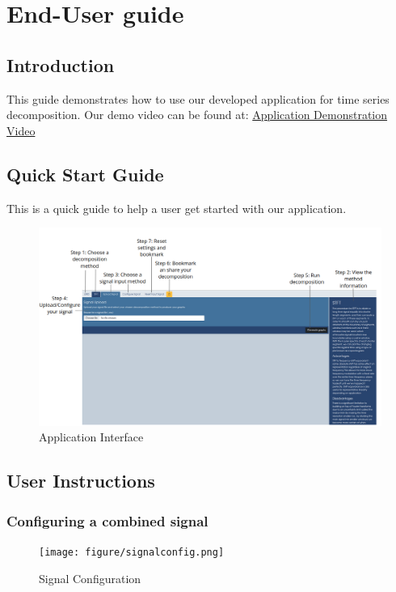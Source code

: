 \section{End-User guide}
\subsection{Introduction}
This guide demonstrates how to use our developed application for time series decomposition.
Our demo video can be found at: 
\href{https://www.overleaf.com/learn}{Application Demonstration Video}

\subsection{Quick Start Guide}
This is a quick guide to help a user get started with our application.
\begin{figure}
\centering
\includegraphics[width=1.0\textwidth]{figure/quickguidesteps.png}
\caption{\label{fig:Application Interface}Application Interface}
\end{figure}


\subsection{User Instructions}
\subsubsection{Configuring a combined signal}
\begin{figure}
\centering
\texttt{[image: figure/signalconfig.png]}
\caption{\label{fig:Signal Configuration}Signal Configuration}
\end{figure}

